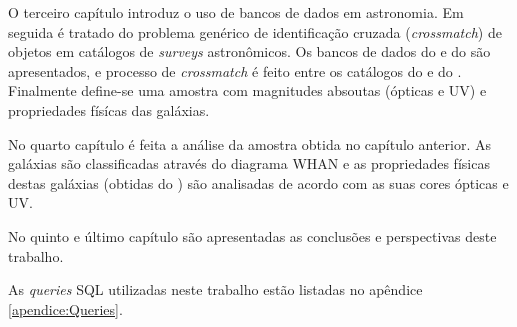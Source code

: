 O terceiro capítulo introduz o uso de bancos de dados em astronomia. Em seguida
é tratado do problema genérico de identificação cruzada ({\em crossmatch}) de
objetos em catálogos de {\em surveys} astronômicos. Os bancos de dados do \SDSS
e do \starlight são apresentados, e processo de {\em crossmatch} é feito entre
os catálogos do \SDSS e do \galex. Finalmente define-se uma amostra com
magnitudes absoutas (ópticas e UV) e propriedades físícas das galáxias.

No quarto capítulo é feita a análise da amostra obtida no capítulo anterior. As
galáxias são classificadas através do diagrama WHAN e as propriedades físicas
destas galáxias (obtidas do \starlight) são analisadas de acordo com as suas
cores ópticas e UV.

No quinto e último capítulo são apresentadas as conclusões e perspectivas deste
trabalho.

As {\em queries} SQL utilizadas neste trabalho estão listadas no apêndice
\ref{apendice:Queries}.

